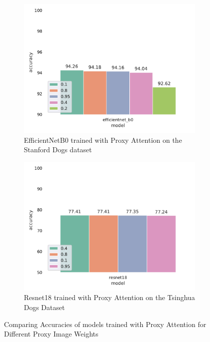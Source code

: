 \begin{figure}[!htb]
    \begin{subfigure}[h]{.5\textwidth}
        \includegraphics[width=\linewidth, right]{results/proxy_weight_results.pdf}
        \caption{EfficientNetB0 \cite{tanEfficientnetRethinkingModel2019} trained with Proxy Attention on the Stanford Dogs dataset\cite{khoslaNovelDatasetFineGrained}}
    \end{subfigure}
    \begin{subfigure}[h]{.5\textwidth}
        \includegraphics[width=\linewidth, left]{results/proxy_weight_results_tsing.pdf}
        \caption{Resnet18 \cite{heDeepResidualLearning2016} trained with Proxy Attention on the Tsinghua Dogs Dataset \cite{zouNewDatasetDog2020}}
    \end{subfigure}
    
    \caption{Comparing Accuracies of models trained with Proxy Attention for Different Proxy Image Weights}
    \label{fig:proxy_weight}
\end{figure}

